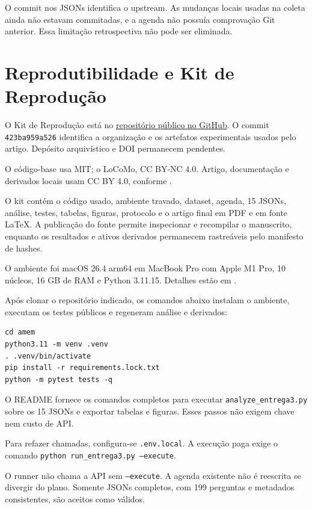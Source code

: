 \documentclass[sigconf]{acmart}
\begin{document}
O commit nos JSONs identifica o upstream. As mudanças locais usadas na coleta ainda não estavam commitadas, e a agenda não possuía comprovação Git anterior. Essa limitação retrospectiva não pode ser eliminada.

\section{Reprodutibilidade e Kit de Reprodução}

O Kit de Reprodução está no
\href{https://github.com/patrickdeangelis/amem-locomo-replication}{repositório público no GitHub}.
O commit \texttt{423ba959a526} identifica a organização e os artefatos experimentais usados pelo artigo. Depósito arquivístico e DOI permanecem pendentes.

O código-base usa MIT; o LoCoMo, CC BY-NC 4.0. Artigo, documentação e derivados locais usam CC BY 4.0, conforme .

O kit contém o código usado, ambiente travado, dataset, agenda, 15 JSONs, análise, testes, tabelas, figuras, protocolo e o artigo final em PDF e em fonte \LaTeX. A publicação do fonte permite inspecionar e recompilar o manuscrito, enquanto os resultados e ativos derivados permanecem rastreáveis pelo manifesto de hashes.

O ambiente foi macOS 26.4 arm64 em MacBook Pro com Apple M1 Pro, 10 núcleos, 16 GB de RAM e Python 3.11.15. Detalhes estão em .

Após clonar o repositório indicado, os comandos abaixo instalam o ambiente, executam os testes públicos e regeneram análise e derivados:

\begin{verbatim}
cd amem
python3.11 -m venv .venv
. .venv/bin/activate
pip install -r requirements.lock.txt
python -m pytest tests -q
\end{verbatim}

O README fornece os comandos completos para executar \texttt{analyze\_entrega3.py} sobre os 15 JSONs e exportar tabelas e figuras. Esses passos não exigem chave nem custo de API.

Para refazer chamadas, configura-se \texttt{.env.local}. A execução paga exige o comando \texttt{python run\_entrega3.py --execute}.

O runner não chama a API sem \texttt{--execute}. A agenda existente não é reescrita se divergir do plano. Somente JSONs completos, com 199 perguntas e metadados consistentes, são aceitos como válidos.
\end{document}
